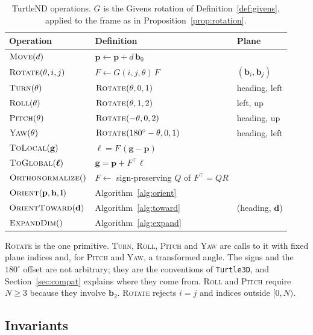 \documentclass[11pt,letterpaper]{article}
\newcommand{\pos}{\mathbf{p}}
\newcommand{\basis}{\mathbf{b}}
\newcommand{\code}[1]{\texttt{#1}}
\newcommand{\op}[1]{\textup{\textsc{#1}}}
\begin{document}
\begin{table}[h]
\centering
\caption{TurtleND operations. $G$ is the Givens rotation of
Definition~\ref{def:givens}, applied to the frame as in
Proposition~\ref{prop:rotation}.}
\label{tab:ops}
\begin{tabular}{@{}lll@{}}
\toprule
\textbf{Operation} & \textbf{Definition} & \textbf{Plane} \\
\midrule
$\op{Move}(d)$ & $\pos \leftarrow \pos + d\,\basis_0$ & \\
$\op{Rotate}(\theta, i, j)$ & $F \leftarrow G(i, j, \theta)\,F$ & $(\basis_i, \basis_j)$ \\
$\op{Turn}(\theta)$ & $\op{Rotate}(\theta, 0, 1)$ & heading, left \\
$\op{Roll}(\theta)$ & $\op{Rotate}(\theta, 1, 2)$ & left, up \\
$\op{Pitch}(\theta)$ & $\op{Rotate}(-\theta, 0, 2)$ & heading, up \\
$\op{Yaw}(\theta)$ & $\op{Rotate}(180^\circ - \theta, 0, 1)$ & heading, left \\
$\op{ToLocal}(\mathbf{g})$ & $\bm{\ell} = F\,(\mathbf{g} - \pos)$ & \\
$\op{ToGlobal}(\bm{\ell})$ & $\mathbf{g} = \pos + F^\top \bm{\ell}$ & \\
$\op{Orthonormalize}()$ & $F \leftarrow$ sign-preserving $Q$ of $F^\top = QR$ & \\
$\op{Orient}(\pos, \mathbf{h}, \mathbf{l})$ & Algorithm~\ref{alg:orient} & \\
$\op{OrientToward}(\mathbf{d})$ & Algorithm~\ref{alg:toward} & (heading, $\mathbf{d}$) \\
$\op{ExpandDim}()$ & Algorithm~\ref{alg:expand} & \\
\bottomrule
\end{tabular}
\end{table}

\op{Rotate} is the one primitive. \op{Turn}, \op{Roll},
\op{Pitch} and \op{Yaw} are calls to it with fixed plane
indices and, for \op{Pitch} and \op{Yaw}, a transformed angle.
The signs and the $180^\circ$ offset are not arbitrary; they are the
conventions of \code{Turtle3D}, and Section~\ref{sec:compat} explains
where they come from. \op{Roll} and \op{Pitch} require
$N \geq 3$ because they involve $\basis_2$. \op{Rotate} rejects
$i = j$ and indices outside $[0, N)$.

\subsection{Invariants}
\end{document}
